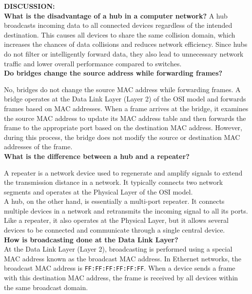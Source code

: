 \documentclass[a4paper,12pt]{article}
\begin{document}
\noindent
\textbf{DISCUSSION:}\\
\textbf{What is the disadvantage of a hub in a computer network?} 
\noindent
A hub broadcasts incoming data to all connected devices regardless of the intended destination. This causes all devices to share the same collision domain, which increases the chances of data collisions and reduces network efficiency. Since hubs do not filter or intelligently forward data, they also lead to unnecessary network traffic and lower overall performance compared to switches.\\

\noindent
\textbf{Do bridges change the source address while forwarding frames?} 

\noindent
No, bridges do not change the source MAC address while forwarding frames. A bridge operates at the Data Link Layer (Layer 2) of the OSI model and forwards frames based on MAC addresses. When a frame arrives at the bridge, it examines the source MAC address to update its MAC address table and then forwards the frame to the appropriate port based on the destination MAC address. However, during this process, the bridge does not modify the source or destination MAC addresses of the frame.\\

\noindent
\textbf{ What is the difference between a hub and a repeater?}

\noindent
A repeater is a network device used to regenerate and amplify signals to extend the transmission distance in a network. It typically connects two network segments and operates at the Physical Layer of the OSI model. \\
\noindent
A hub, on the other hand, is essentially a multi-port repeater. It connects multiple devices in a network and retransmits the incoming signal to all its ports. Like a repeater, it also operates at the Physical Layer, but it allows several devices to be connected and communicate through a single central device.\\

\noindent
\textbf{How is broadcasting done at the Data Link Layer?} \\
\noindent
At the Data Link Layer (Layer 2), broadcasting is performed using a special MAC address known as the broadcast MAC address. In Ethernet networks, the broadcast MAC address is \texttt{FF:FF:FF:FF:FF:FF}. When a device sends a frame with this destination MAC address, the frame is received by all devices within the same broadcast domain.\\
\end{document}

